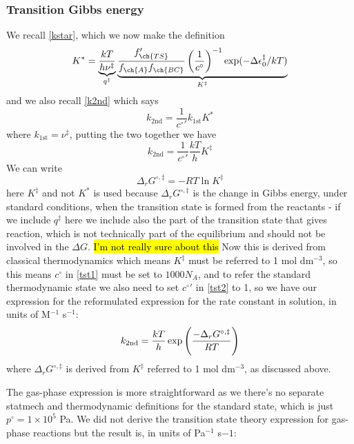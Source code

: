 \subsubsection{Transition Gibbs energy}
We recall \cref{kstar}, which we now make the definition
\begin{equation}
\label{tst1}
  K^*=\underbrace{\frac{kT}{h\nu^{\ddag}}}_{q^{\ddag}}\underbrace{\frac{f'_{\ch{TS}}}{f_{\ch{A}}f_{\ch{BC}}}\lf(\frac{1}{c^{\circ}} \rt)^{-1}\exp(-\Delta\ep_0^{\ddag}/kT)}_{K^{\ddag}}
\end{equation}
and we also recall \cref{k2nd} which says
\begin{equation}
  k_{\text{2nd}}=\frac{1}{{c^{\circ}}'}k_{\text{1st}}K^*
\end{equation}
where $k_{\text{1st}}=\nu^{\ddag}$, putting the two together we have
\begin{equation}
\label{tst2}
  k_{\text{2nd}}=\frac{1}{{c^{\circ}}'}\frac{kT}{h}K^{\ddag}
\end{equation}
We can write 
\begin{equation}
  \Delta_rG^{\circ,\ddag}=-RT\ln K^{\ddag}
\end{equation}
here $K^{\ddag}$ and not $K^*$ is used because $\Delta_rG^{\circ,\ddag}$ is the change in Gibbs energy, under standard conditions, when the transition state is formed from the reactants - if we include $q^{\ddag}$ here we include also the part of the transition state that gives reaction, which is not technically part of the equilibrium and should not be involved in the $\Delta G$. \hl{I'm not really sure about this} Now this is derived from classical thermodynamics which means $K^{\ddag}$ must be referred to 1 mol dm$^{-3}$, so this means $c^{\circ}$ in \cref{tst1} must be set to $1000N_A$, and to refer the standard thermodynamic state we also need to set ${c^{\circ}}'$ in \cref{tst2} to 1, so we have our expression for the reformulated expression for the rate constant in solution, in units of M$^{-1}$ s$^{-1}$:
\begin{equation}
\label{tst2.1}
  k_{\text{2nd}}=\frac{kT}{h}\exp \left(\frac{-\Delta_rG^{\circ,\ddag}}{RT} \right)
\end{equation}
where $\Delta_rG^{\circ,\ddag}$ is derived from $K^{\ddag}$ referred to 1 mol dm$^{-3}$, as discussed above.\par
The gas-phase expression is more straightforward as we there's no separate statmech and thermodynamic definitions for the standard state, which is just $p^{\circ}=1\times10^5$ Pa. We did not derive the transition state theory expression for gas-phase reactions but the result is, in units of Pa$^{-1}$ s${-1}$:
